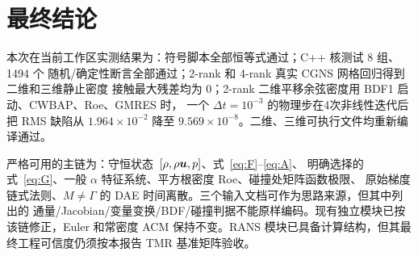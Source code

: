 \documentclass[UTF8,11pt,a4paper]{ctexart}
\begin{document}
\section{最终结论}
本次在当前工作区实测结果为：符号脚本全部恒等式通过；C++ 核测试 8 组、1494 个
随机/确定性断言全部通过；2-rank 和 4-rank 真实 CGNS 网格回归得到二维和三维静止密度
接触最大残差均为 $0$；2-rank 二维平移余弦密度用 BDF1 启动、CWBAP、Roe、GMRES 时，
一个 $\Delta t=10^{-3}$ 的物理步在4次非线性迭代后把 RMS 缺陷从
$1.964\times10^{-2}$ 降至 $9.569\times10^{-8}$。二维、三维可执行文件均重新编译通过。

严格可用的主链为：守恒状态~$[\rho,\rho\bm{u},p]$、式~\eqref{eq:F}--\eqref{eq:A}、
明确选择的式~\eqref{eq:G}、一般 $\alpha$ 特征系统、平方根密度 Roe、碰撞处矩阵函数极限、
原始梯度链式法则、$M\ne\Gamma$ 的 DAE 时间离散。三个输入文档可作为思路来源，但其中列出的
通量/Jacobian/变量变换/BDF/碰撞判据不能原样编码。现有独立模块已按该链修正，Euler 和常密度
ACM 保持不变。RANS 模块已具备计算结构，但其最终工程可信度仍须按本报告 TMR 基准矩阵验收。
\end{document}
